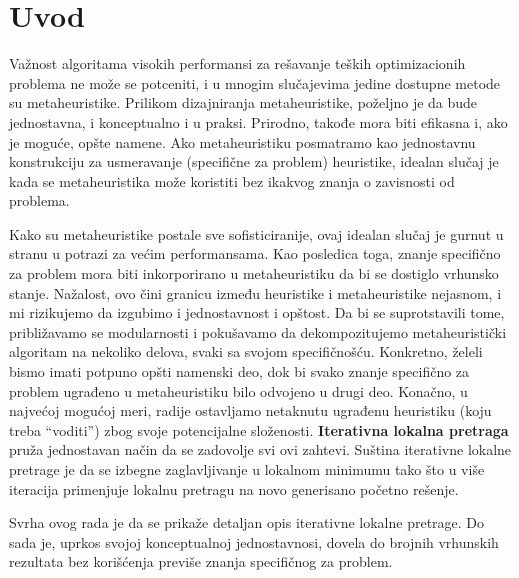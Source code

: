 \documentclass[a4paper]{article}
\newcommand{\q}[1]{``#1''}  %
\begin{document}
\section{Uvod}
\label{sec:uvod}

Važnost algoritama visokih performansi za rešavanje teških optimizacionih problema ne može se potceniti, i u mnogim
slučajevima jedine dostupne metode su metaheuristike. Prilikom dizajniranja metaheuristike, poželjno je da bude jednostavna, i
konceptualno i u praksi. Prirodno, takođe mora biti efikasna i, ako je moguće, opšte namene. Ako metaheuristiku posmatramo kao
jednostavnu konstrukciju za usmeravanje (specifične za problem) heuristike, idealan slučaj je kada se metaheuristika može
koristiti bez ikakvog znanja o zavisnosti od problema.

Kako su metaheuristike postale sve sofisticiranije, ovaj idealan
slučaj je gurnut u stranu u potrazi za većim performansama. Kao posledica toga, znanje specifično za problem mora biti
inkorporirano u metaheuristiku da bi se dostiglo vrhunsko stanje. Nažalost, ovo čini granicu između heuristike i
metaheuristike nejasnom, i mi rizikujemo da izgubimo i jednostavnost i opštost. Da bi se suprotstavili tome, približavamo se
modularnosti i pokušavamo da dekompozitujemo metaheuristički algoritam na nekoliko delova, svaki sa svojom specifičnošću.
Konkretno, želeli bismo imati potpuno opšti namenski deo, dok bi svako znanje specifično za problem ugrađeno u metaheuristiku
bilo odvojeno u drugi deo. Konačno, u najvećoj mogućoj meri, radije ostavljamo netaknutu ugrađenu heuristiku (koju treba
\q{voditi}) zbog svoje potencijalne složenosti. \textbf{Iterativna lokalna pretraga} pruža jednostavan način da se zadovolje svi
ovi zahtevi. Suština iterativne lokalne pretrage je da se izbegne zaglavljivanje u lokalnom minimumu tako što u više iteracija primenjuje
lokalnu pretragu na novo generisano početno rešenje.

Svrha ovog rada je da se prikaže detaljan opis iterativne lokalne pretrage.
Do sada je, uprkos svojoj konceptualnoj jednostavnosi, dovela do brojnih vrhunskih rezultata bez korišćenja previše znanja
specifičnog za problem.

\end{document}
